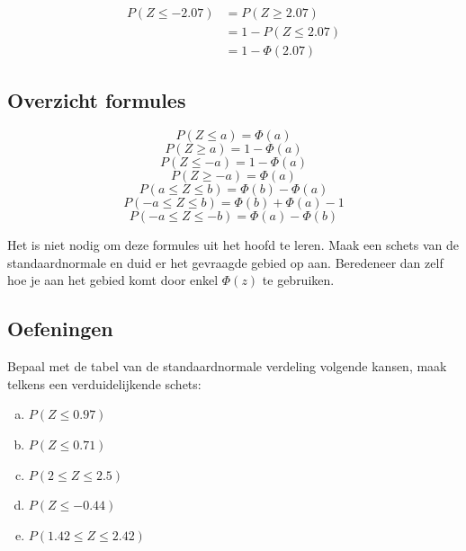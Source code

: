 \documentclass[12pt,twoside]{article}
\begin{document}
{\begin{minipage}{0.5\textwidth}
\begin{align*}
  P(Z\leq -2.07) &= P(Z \geq 2.07)\\
                 &= 1 - P(Z \leq 2.07)\\
                 &= 1 - \Phi(2.07)
\end{align*}
\end{minipage}
\begin{minipage}{0.5\textwidth}
\vspace*{1cm}
\begin{center}
\end{center}
\end{minipage}

\pagebreak
\subsection{Overzicht formules}
\begin{multicols}{2}
  $$P(Z\leq a)=\Phi(a)$$
  $$P(Z\geq a)=1-\Phi(a)$$
  $$P(Z\leq -a)=1-\Phi(a)$$
  $$P(Z\geq -a)=\Phi(a)$$
  \vfill
  $$P(a\leq Z \leq b)=\Phi(b)-\Phi(a)$$
  $$P(-a\leq Z \leq b)=\Phi(b)+\Phi(a)-1$$
  $$P(-a\leq Z \leq -b)=\Phi(a)-\Phi(b)$$
\end{multicols}

Het is niet nodig om deze formules uit het hoofd te leren. Maak een schets van de standaardnormale en duid er het gevraagde gebied op aan. Beredeneer dan zelf hoe je aan het gebied komt door enkel $\Phi(z)$ te gebruiken.

\subsection{Oefeningen}

\begin{oefening}
Bepaal met de tabel van de standaardnormale verdeling volgende kansen, maak telkens een verduidelijkende schets:
\begin{enumerate}[(a)]
  \item $P(Z\leq 0.97)$
  \item $P(Z\leq 0.71)$
  \item $P(2\leq Z \leq 2.5)$
  \item $P(Z \leq -0.44)$
  \item $P(1.42 \leq Z \leq 2.42)$
\end{enumerate}
\end{oefening}

}
\end{document}
